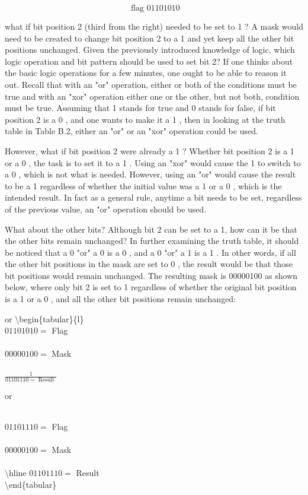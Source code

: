 \documentclass[10pt]{article}
\begin{document}
$$
\text { flag } 01101010
$$

what if bit position 2 (third from the right) needed to be set to 1 ? A mask would need to be created to change bit position 2 to a 1 and yet keep all the other bit positions unchanged. Given the previously introduced knowledge of logic, which logic operation and bit pattern should be used to set bit 2? If one thinks about the basic logic operations for a few minutes, one ought to be able to reason it out. Recall that with an "or" operation, either or both of the conditions must be true and with an "xor" operation either one or the other, but not both, condition must be true. Assuming that 1 stands for true and 0 stands for false, if bit position 2 is a 0 , and one wants to make it a 1 , then in looking at the truth table in Table B.2, either an "or" or an "xor" operation could be used.

However, what if bit position 2 were already a 1 ? Whether bit position 2 is a 1 or a 0 , the task is to set it to a 1 . Using an "xor" would cause the 1 to switch to a 0 , which is not what is needed. However, using an "or" would cause the result to be a 1 regardless of whether the initial value was a 1 or a 0 , which is the intended result. In fact as a general rule, anytime a bit needs to be set, regardless of the previous value, an "or" operation should be used.

What about the other bits? Although bit 2 can be set to a 1, how can it be that the other bits remain unchanged? In further examining the truth table, it should be noticed that a 0 "or" a 0 is a 0 , and a 0 "or" a 1 is a 1 . In other words, if all the other bit positions in the mask are set to 0 , the result would be that those bit positions would remain unchanged. The resulting mask is 00000100 as shown below, where only bit 2 is set to 1 regardless of whether the original bit position is a 1 or a 0 , and all the other bit positions remain unchanged:

or \textbackslash begin\{tabular\}\{l\}\\
$01101010=$ Flag \\
\\
$00000100=$ Mask \\
\\
$\frac{1}{01101110=\text { Result }}$

 or $\quad$\begin{tabular}{l}
\end{tabular}

$01101110=$ Flag \\
\\
$00000100=$ Mask \\
\\
\textbackslash hline $01101110=$ Result\\
\textbackslash end\{tabular\}
\end{document}
